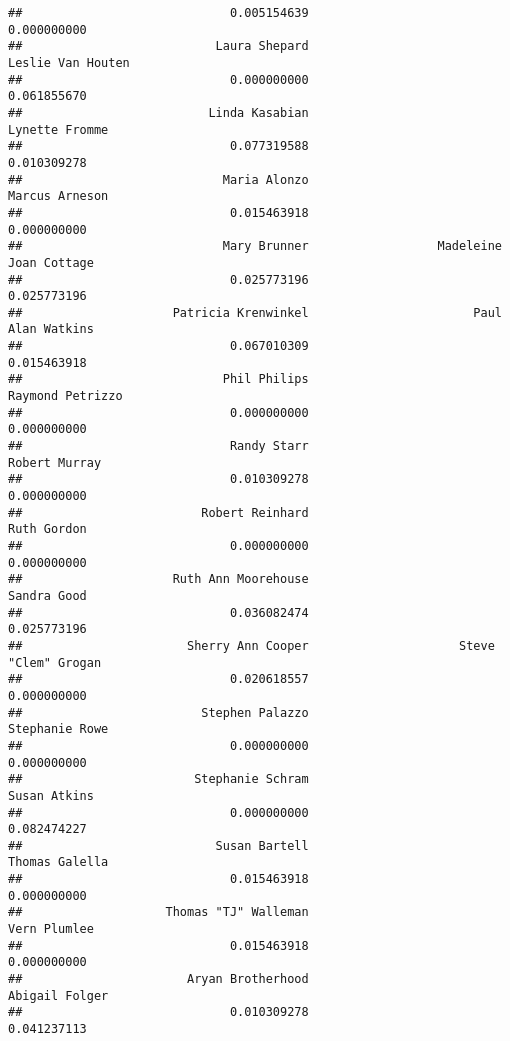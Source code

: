 \documentclass[
]{article}
\begin{document}
\begin{verbatim}
##                             0.005154639                             0.000000000 
##                           Laura Shepard                       Leslie Van Houten 
##                             0.000000000                             0.061855670 
##                          Linda Kasabian                          Lynette Fromme 
##                             0.077319588                             0.010309278 
##                            Maria Alonzo                          Marcus Arneson 
##                             0.015463918                             0.000000000 
##                            Mary Brunner                  Madeleine Joan Cottage 
##                             0.025773196                             0.025773196 
##                     Patricia Krenwinkel                       Paul Alan Watkins 
##                             0.067010309                             0.015463918 
##                            Phil Philips                        Raymond Petrizzo 
##                             0.000000000                             0.000000000 
##                             Randy Starr                           Robert Murray 
##                             0.010309278                             0.000000000 
##                         Robert Reinhard                             Ruth Gordon 
##                             0.000000000                             0.000000000 
##                     Ruth Ann Moorehouse                             Sandra Good 
##                             0.036082474                             0.025773196 
##                       Sherry Ann Cooper                     Steve "Clem" Grogan 
##                             0.020618557                             0.000000000 
##                         Stephen Palazzo                          Stephanie Rowe 
##                             0.000000000                             0.000000000 
##                        Stephanie Schram                            Susan Atkins 
##                             0.000000000                             0.082474227 
##                           Susan Bartell                          Thomas Galella 
##                             0.015463918                             0.000000000 
##                    Thomas "TJ" Walleman                            Vern Plumlee 
##                             0.015463918                             0.000000000 
##                       Aryan Brotherhood                          Abigail Folger 
##                             0.010309278                             0.041237113 

\end{verbatim}
\end{document}
